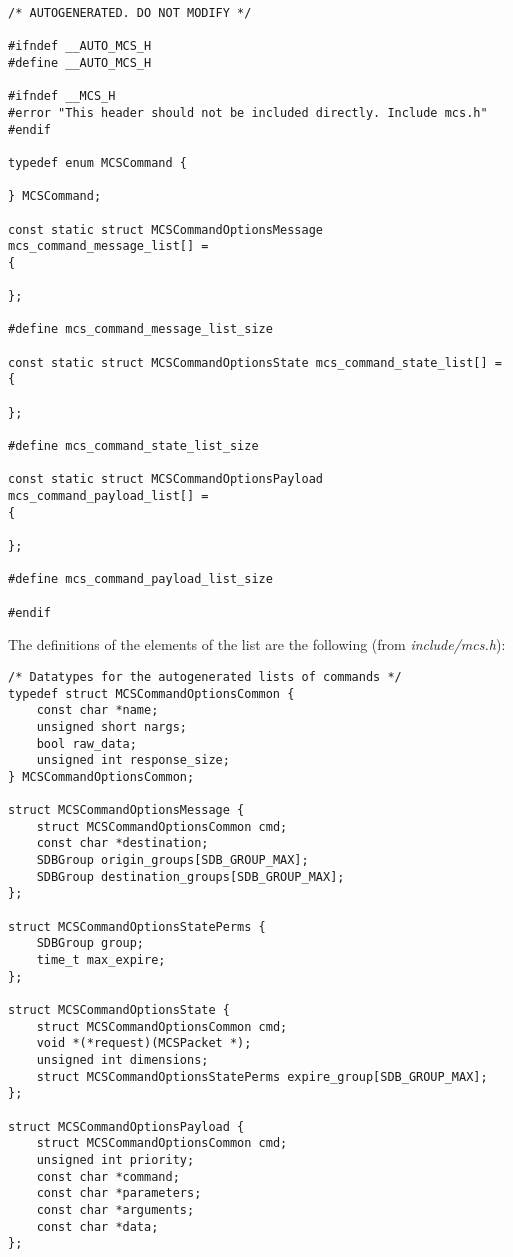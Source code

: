 \documentclass[12pt,a4paper]{report}
\begin{document}
\begin{lstlisting}
/* AUTOGENERATED. DO NOT MODIFY */

#ifndef __AUTO_MCS_H
#define __AUTO_MCS_H

#ifndef __MCS_H
#error "This header should not be included directly. Include mcs.h"
#endif

typedef enum MCSCommand {
    
} MCSCommand;

const static struct MCSCommandOptionsMessage mcs_command_message_list[] =
{
    
};

#define mcs_command_message_list_size 

const static struct MCSCommandOptionsState mcs_command_state_list[] =
{
    
};

#define mcs_command_state_list_size 

const static struct MCSCommandOptionsPayload mcs_command_payload_list[] =
{
    
};

#define mcs_command_payload_list_size 

#endif
\end{lstlisting}

The definitions of the elements of the list are the following (from \textit{include/mcs.h}):
\begin{lstlisting}
/* Datatypes for the autogenerated lists of commands */
typedef struct MCSCommandOptionsCommon {
    const char *name;
    unsigned short nargs;
    bool raw_data;
    unsigned int response_size;
} MCSCommandOptionsCommon;

struct MCSCommandOptionsMessage {
    struct MCSCommandOptionsCommon cmd;
    const char *destination;
    SDBGroup origin_groups[SDB_GROUP_MAX];
    SDBGroup destination_groups[SDB_GROUP_MAX];
};

struct MCSCommandOptionsStatePerms {
    SDBGroup group;
    time_t max_expire;
};

struct MCSCommandOptionsState {
    struct MCSCommandOptionsCommon cmd;
    void *(*request)(MCSPacket *);
    unsigned int dimensions;
    struct MCSCommandOptionsStatePerms expire_group[SDB_GROUP_MAX];
};

struct MCSCommandOptionsPayload {
    struct MCSCommandOptionsCommon cmd;
    unsigned int priority;
    const char *command;
    const char *parameters;
    const char *arguments;
    const char *data;
};
\end{lstlisting}
\end{document}
